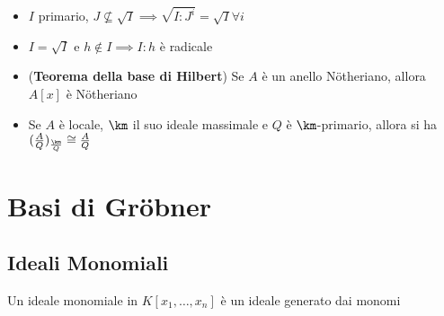 \documentclass[a4paper,NoNotes,GeneralMath]{stdmdoc}
\begin{document}
\begin{itemize}
		\item $I$ primario, $J \not\subseteq \sqrt{I} \implies \sqrt{I : J^i} = \sqrt{I} \forall i$
		\item $I = \sqrt{I}$ e $h \notin I \implies I:h$ è radicale
		\item ({\bf Teorema della base di Hilbert}) Se $A$ è un anello Nötheriano, allora $A[x]$ è Nötheriano
		\item Se $A$ è locale, $\km$ il suo ideale massimale e $Q$ è $\km$-primario, allora si ha $(\frac{A}{Q})_{\frac{\km}{Q}} \cong \frac{A}{Q}$
	\end{itemize}
	
	\section*{Basi di Gröbner}
	\subsection*{Ideali Monomiali}
	Un ideale monomiale in $K[x_1, \ldots, x_n]$ è un ideale generato dai monomi
\end{document}
